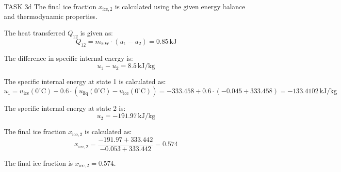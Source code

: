 TASK 3d  
The final ice fraction \( x_{\text{ice},2} \) is calculated using the given energy balance and thermodynamic properties.  

The heat transferred \( Q_{12} \) is given as:  
\[
Q_{12} = m_{\text{EW}} \cdot (u_1 - u_2) = 0.85 \, \text{kJ}
\]  

The difference in specific internal energy is:  
\[
u_1 - u_2 = 8.5 \, \text{kJ/kg}
\]  

The specific internal energy at state 1 is calculated as:  
\[
u_1 = u_{\text{ice}}(0^\circ\text{C}) + 0.6 \cdot (u_{\text{liq}}(0^\circ\text{C}) - u_{\text{ice}}(0^\circ\text{C})) = -333.458 + 0.6 \cdot (-0.045 + 333.458) = -133.4102 \, \text{kJ/kg}
\]  

The specific internal energy at state 2 is:  
\[
u_2 = -191.97 \, \text{kJ/kg}
\]  

The final ice fraction \( x_{\text{ice},2} \) is calculated as:  
\[
x_{\text{ice},2} = \frac{-191.97 + 333.442}{-0.053 + 333.442} = 0.574
\]  

The final ice fraction is \( x_{\text{ice},2} = 0.574 \).